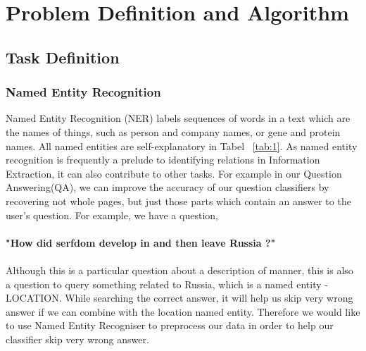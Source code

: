 \documentclass[10pt,twocolumn,letterpaper]{article}
\begin{document}
\section{Problem Definition and Algorithm}
\subsection{Task Definition}

\subsubsection{Named Entity Recognition}
Named Entity Recognition (NER) \cite{finkel2005incorporating}labels sequences of words in a text which are the names of things, such as person and company names, or gene and protein names. All named entities are self-explanatory in Tabel ~\ref{tab:1}. As named entity recognition is frequently a prelude to identifying relations in Information Extraction, it can also contribute to other tasks. For example in our Question Answering(QA), we can improve the accuracy of our question classifiers by recovering not whole pages, but just those parts which contain an answer to the user's question. For example, we have a question, \\\\{\bf "How did serfdom develop in and then leave Russia ?"} \\\\Although this is a particular question about a description of manner, this is also a question to query something related to Russia, which is a named entity - LOCATION. While searching the correct answer, it will help us skip very wrong answer if we can combine with the location named entity. Therefore we would like to use Named Entity Recogniser to preprocess our data in order to help our classifier skip very wrong answer.
	\begin{table}[!hbt]
		\caption{NER}
		\label{tab:1}
	\end{table}
\end{document}
